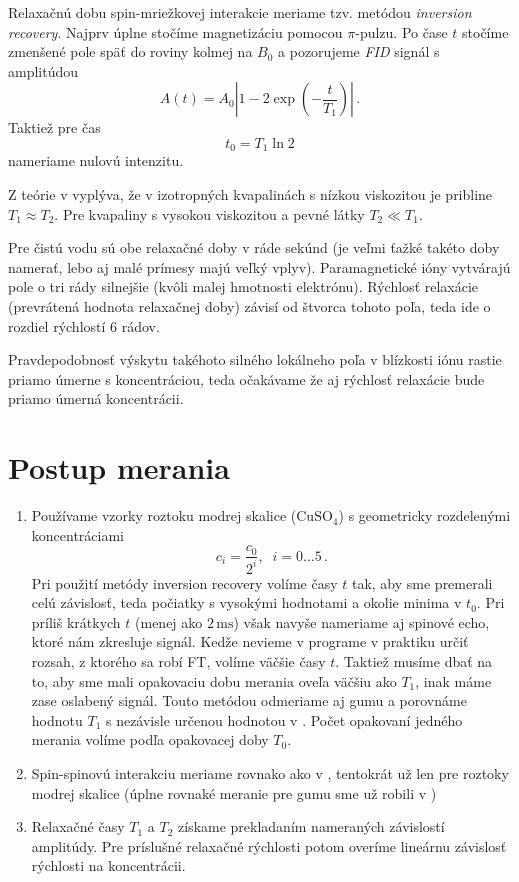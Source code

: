 \documentclass[a4paper, 10pt]{article}
\newcommand{\unit}[1]{\ensuremath{\, \mathrm{#1}}}
\begin{document}
Relaxačnú dobu spin-mriežkovej interakcie meriame tzv. metódou \textit{inversion recovery}. Najprv úplne stočíme magnetizáciu  pomocou $\pi$-pulzu. Po čase $t$ stočíme zmenšené pole späť do roviny kolmej na $B_0$ a pozorujeme \textit{FID} signál s amplitúdou
\begin{equation}
\label{eq:teor:ir}
A(t) = A_0 \left|1 - 2\exp\left(-\frac{t}{T_1}\right)\right|\,.
\end{equation}
Taktiež pre čas 
\begin{equation}
\label{eq:teor:t0}
t_0 = T_1\ln 2
\end{equation}
nameriame nulovú intenzitu. 

Z teórie v \cite{stud} vyplýva, že v izotropných kvapalinách s nízkou viskozitou je pribline $T_1 \approx T_2$. Pre kvapaliny s vysokou viskozitou a pevné látky $T_2 \ll T_1$.

Pre čistú vodu sú obe relaxačné doby v ráde sekúnd (je veľmi ťažké takéto doby namerať, lebo aj malé prímesy majú veľký vplyv). Paramagnetické ióny vytvárajú pole o tri rády silnejšie (kvôli malej hmotnosti elektrónu). Rýchlosť relaxácie (prevrátená hodnota relaxačnej doby) závisí od štvorca tohoto poľa, teda ide o rozdiel rýchlostí 6 rádov. 

Pravdepodobnosť výskytu takéhoto silného lokálneho poľa v blízkosti iónu rastie priamo úmerne s koncentráciou, teda očakávame že aj rýchlosť relaxácie bude priamo úmerná koncentrácii.



\section*{Postup merania}
\begin{enumerate}
\item Používame vzorky roztoku modrej skalice ($\mathrm{CuSO_4}$) s geometricky rozdelenými koncentráciami 
\begin{equation}
\label{eq:postup:conc}
c_i = \frac{c_0}{2^i}, \;\; i = 0\ldots 5 \,.
\end{equation}
Pri použití metódy inversion recovery volíme časy $t$ tak, aby sme premerali celú závislosť, teda počiatky s vysokými hodnotami a okolie minima v $t_0$. Pri príliš krátkych $t$ (menej ako $2\unit{ms}$) však navyše nameriame aj spinové echo, ktoré nám zkresluje signál. Kedže nevieme v programe v praktiku určiť rozsah, z ktorého sa robí FT, volíme väčšie časy $t$. Taktiež musíme dbať na to, aby sme mali opakovaciu dobu merania oveľa väčšiu ako $T_1$, inak máme zase oslabený signál. Touto metódou odmeriame aj gumu a porovnáme hodnotu $T_1$ s nezávisle určenou hodnotou v \cite{predch}.  Počet opakovaní jedného merania volíme podľa opakovacej doby $T_0$.
\item Spin-spinovú interakciu meriame rovnako ako v \cite{predch}, tentokrát už len pre roztoky modrej skalice (úplne rovnaké meranie pre gumu sme už robili v \cite{predch})
\item Relaxačné časy $T_1$ a $T_2$ získame prekladaním nameraných závislostí amplitúdy. Pre príslušné relaxačné rýchlosti potom overíme lineárnu závislosť rýchlosti na koncentrácii. 
\end{enumerate}
\end{document}

